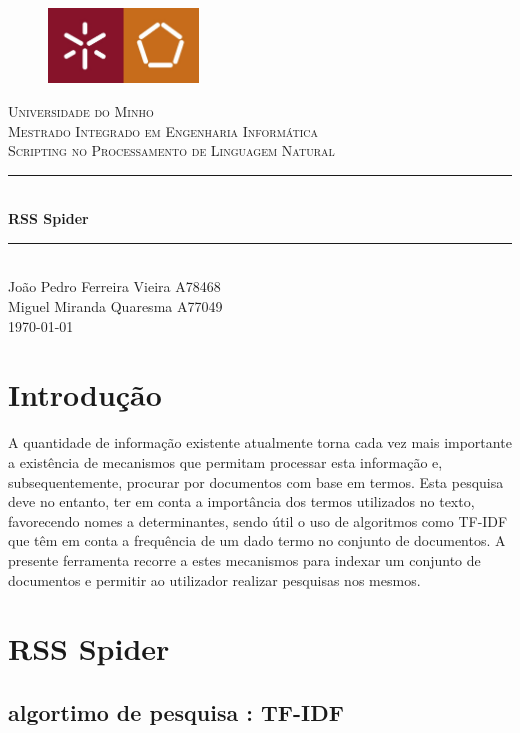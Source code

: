 \documentclass{article}
\newcommand{\titleRule}{
    \rule{\linewidth}{0.5mm} \\ [0.25cm]
}
\begin{document}
\begin{titlepage}
    \center
    \begin{figure}[H]
        \centering
        \includegraphics[width=4cm]{UM_EENG.jpg}
    \end{figure}
    \textsc{\LARGE Universidade do Minho} \\ [1.5cm]
    \textsc{\Large Mestrado Integrado em Engenharia Informática} \\ [0.5cm]
    \textsc{\large Scripting no Processamento de Linguagem Natural} \\ [0.5cm]

    \titleRule
    {\huge \bfseries RSS Spider}
    \titleRule

    João Pedro Ferreira Vieira A78468 \\
    Miguel Miranda Quaresma A77049 \\[0.25cm]

    \today
\end{titlepage}

\tableofcontents

\newpage

\section{Introdução}
A quantidade de informação existente atualmente torna cada vez mais importante a existência de mecanismos que permitam processar
esta informação e, subsequentemente, procurar por documentos com base em termos. Esta pesquisa deve no entanto, ter em conta a
importância dos termos utilizados no texto, favorecendo nomes a determinantes, sendo útil o uso de algoritmos como TF-IDF que 
têm em conta a frequência de um dado termo no conjunto de documentos. 
A presente ferramenta recorre a estes mecanismos para indexar um conjunto de documentos e permitir ao utilizador realizar pesquisas
nos mesmos.

\section{RSS Spider}
\subsection{algortimo de pesquisa : TF-IDF}
\end{document}
